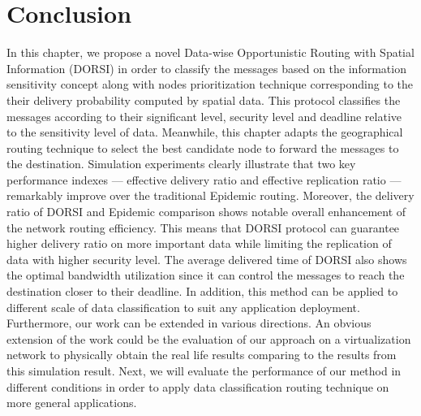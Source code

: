 \section{Conclusion}
\label{DORSI:Conclusion}
In this chapter, we propose a novel Data-wise Opportunistic Routing with Spatial Information (DORSI) in order to classify the messages based on the information sensitivity concept along with nodes prioritization technique corresponding to the their delivery probability computed by spatial data. 
This protocol classifies the messages according to their significant level, security level and deadline relative to the sensitivity level of data. 
Meanwhile, this chapter adapts the geographical routing technique to select the best candidate node to forward the messages to the destination. 
Simulation experiments clearly illustrate that two key performance indexes — effective delivery ratio and effective replication ratio — remarkably improve over the traditional Epidemic routing. Moreover, the delivery ratio of DORSI and Epidemic comparison shows notable overall enhancement of the network routing efficiency. 
This means that DORSI protocol can guarantee higher delivery ratio on more important data while limiting the replication of data with higher security level. 
The average delivered time of DORSI also shows the optimal bandwidth utilization since it can control the messages to reach the destination closer to their deadline. 
In addition, this method can be applied to different scale of data classification to suit any application deployment. 
Furthermore, our work can be extended in various directions. 
An obvious extension of the work could be the evaluation of our approach on a virtualization network to physically obtain the real life results comparing to the results from this simulation result. 
Next, we will evaluate the performance of our method in different conditions in order to apply data classification routing technique on more general applications.











































